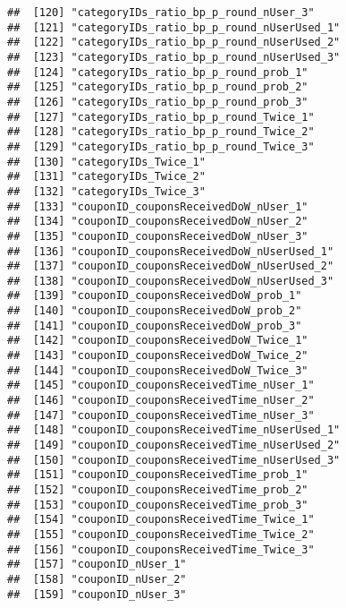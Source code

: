 \documentclass[10pt]{report}
\begin{document}
\begin{verbatim}
##  [120] "categoryIDs_ratio_bp_p_round_nUser_3"                 
##  [121] "categoryIDs_ratio_bp_p_round_nUserUsed_1"             
##  [122] "categoryIDs_ratio_bp_p_round_nUserUsed_2"             
##  [123] "categoryIDs_ratio_bp_p_round_nUserUsed_3"             
##  [124] "categoryIDs_ratio_bp_p_round_prob_1"                  
##  [125] "categoryIDs_ratio_bp_p_round_prob_2"                  
##  [126] "categoryIDs_ratio_bp_p_round_prob_3"                  
##  [127] "categoryIDs_ratio_bp_p_round_Twice_1"                 
##  [128] "categoryIDs_ratio_bp_p_round_Twice_2"                 
##  [129] "categoryIDs_ratio_bp_p_round_Twice_3"                 
##  [130] "categoryIDs_Twice_1"                                  
##  [131] "categoryIDs_Twice_2"                                  
##  [132] "categoryIDs_Twice_3"                                  
##  [133] "couponID_couponsReceivedDoW_nUser_1"                  
##  [134] "couponID_couponsReceivedDoW_nUser_2"                  
##  [135] "couponID_couponsReceivedDoW_nUser_3"                  
##  [136] "couponID_couponsReceivedDoW_nUserUsed_1"              
##  [137] "couponID_couponsReceivedDoW_nUserUsed_2"              
##  [138] "couponID_couponsReceivedDoW_nUserUsed_3"              
##  [139] "couponID_couponsReceivedDoW_prob_1"                   
##  [140] "couponID_couponsReceivedDoW_prob_2"                   
##  [141] "couponID_couponsReceivedDoW_prob_3"                   
##  [142] "couponID_couponsReceivedDoW_Twice_1"                  
##  [143] "couponID_couponsReceivedDoW_Twice_2"                  
##  [144] "couponID_couponsReceivedDoW_Twice_3"                  
##  [145] "couponID_couponsReceivedTime_nUser_1"                 
##  [146] "couponID_couponsReceivedTime_nUser_2"                 
##  [147] "couponID_couponsReceivedTime_nUser_3"                 
##  [148] "couponID_couponsReceivedTime_nUserUsed_1"             
##  [149] "couponID_couponsReceivedTime_nUserUsed_2"             
##  [150] "couponID_couponsReceivedTime_nUserUsed_3"             
##  [151] "couponID_couponsReceivedTime_prob_1"                  
##  [152] "couponID_couponsReceivedTime_prob_2"                  
##  [153] "couponID_couponsReceivedTime_prob_3"                  
##  [154] "couponID_couponsReceivedTime_Twice_1"                 
##  [155] "couponID_couponsReceivedTime_Twice_2"                 
##  [156] "couponID_couponsReceivedTime_Twice_3"                 
##  [157] "couponID_nUser_1"                                     
##  [158] "couponID_nUser_2"                                     
##  [159] "couponID_nUser_3"                                     

\end{verbatim}
\end{document}

